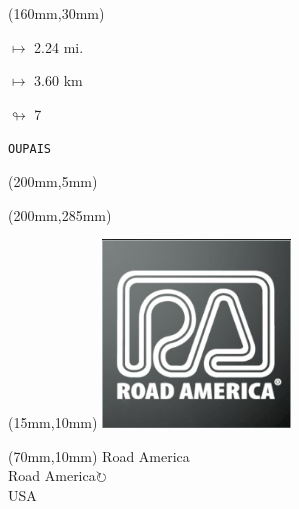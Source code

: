 \begin{textblock*}{40mm}(160mm,30mm)%
\Large
\par$\mapsto$ 2.24 mi.
\par$\mapsto$ 3.60 km
\par$\looparrowright$ 7
\par\hfill\tiny\tt OUPAIS\\
\end{textblock*}
\begin{textblock*}{20mm}(200mm,5mm)%
\fbox{\thepage}
\label{OUPAIS}
\end{textblock*}
\begin{textblock*}{20mm}(200mm,285mm)%
\fbox{\thepage}
\end{textblock*}

\null\newpage
\begin{textblock*}{50mm}(15mm,10mm)%
\includegraphics[width=50mm]{LG/2015-05-20_00092.png}
\end{textblock*}
\begin{textblock*}{130mm}(70mm,10mm)%
{\fontsize{20}{20}\selectfont Road America\\}
{\fontsize{16}{16}\selectfont Road America\hfill \Large$\circlearrowright$\\}
{\fontsize{12}{12}\selectfont USA\\}
\end{textblock*}

